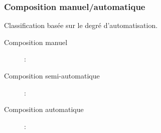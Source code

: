 \begin{description}
      \end{description}

      \subsubsection{Composition manuel/automatique}
      \label{sec:comp-manu}
      Classification basée sur le degré d'automatisation.

      \SpecialItem
      \begin{description}
      \item[Composition manuel] :
      \item[Composition semi-automatique] :
      \item[Composition automatique] :

      \end{description}

